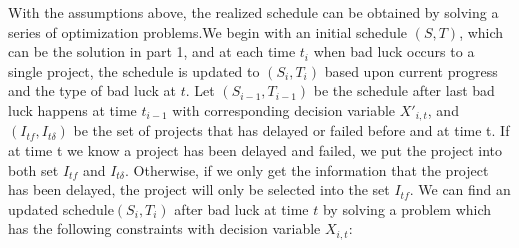 \documentclass[final,3p,times]{elsarticle}
\begin{document}
With the assumptions above, the realized schedule can be obtained by solving a series of optimization problems.We begin with an initial schedule $(S,T)$, which can be the solution in part 1, and at each time $t_i$ when bad luck occurs to a single project, the schedule is updated to $(S_i, T_i)$ based upon current progress and the type of bad luck at $t$. Let $(S_{i-1},T_{i-1})$ be the schedule after last bad luck happens at time $t_{i-1}$ with corresponding decision variable $X'_{i,t}$, and $(I_{tf}, I_{t\delta})$ be the set of projects that has delayed or failed before and at time t. If at time t we know a project has been delayed and failed, we put the project into both set $I_{tf}$ and $I_{t\delta}$. Otherwise, if we only get the information that the project has been delayed, the project will only be selected into the set $I_{tf}$. We can find an updated schedule$(S_{i},T_{i})$ after bad luck at time $t$ by solving a problem which has the following constraints with decision variable $X_{i,t}$:
\end{document}
